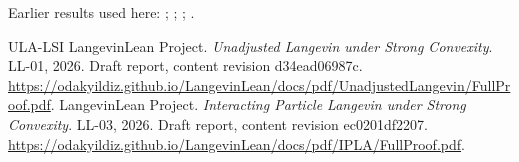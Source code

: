 \documentclass[11pt,a4paper]{article}
\begin{document}
Earlier results used here: \cite[Section~3.17.4]{LangevinLean2026ULASC}; \cite[Section~3.26.3]{LangevinLean2026ULASC}; \cite[Section~3.36.7]{LangevinLean2026ULASC}; \cite[Section~3.1.1]{LangevinLean2026IPLA}.

\begin{thebibliography}{ULA-LSI}
LangevinLean Project. \emph{Unadjusted Langevin under Strong Convexity}. LL-01, 2026. Draft report, content revision d34ead06987c. \url{https://odakyildiz.github.io/LangevinLean/docs/pdf/UnadjustedLangevin/FullProof.pdf}.
LangevinLean Project. \emph{Interacting Particle Langevin under Strong Convexity}. LL-03, 2026. Draft report, content revision ec0201df2207. \url{https://odakyildiz.github.io/LangevinLean/docs/pdf/IPLA/FullProof.pdf}.
\end{thebibliography}
\end{document}
